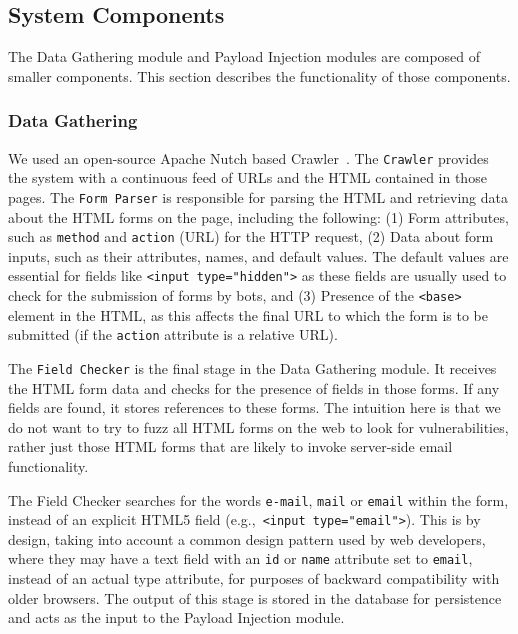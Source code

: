 \subsection{System Components}
\label{Comp}

The Data Gathering module and Payload Injection modules are composed of smaller components. This section describes the functionality of those components.

\subsubsection{Data Gathering}
\label{Comp:Crawler}
We used an open-source Apache Nutch based Crawler~\cite{nutch}. The \texttt{Crawler} provides the system with a continuous feed of URLs and the HTML contained in those pages. 
\label{Comp:FP}
The \texttt{Form Parser} is responsible for parsing the HTML and retrieving data about the HTML
forms on the page, including the following: (1) Form attributes, such
as \texttt{method} and \texttt{action} (URL) for the HTTP request, (2)
Data about form inputs, such as their attributes, names, and
default values. The default values are essential for fields like
{\lstinline{<input type="hidden">}} as these fields are usually used
to check for the submission of forms by bots, and (3) Presence of the {\lstinline{<base>}} element in the HTML, as this affects the final URL to which the form is to be submitted (if the \texttt{action} attribute is a relative URL).

\label{Comp:EMFC}
The \texttt{\Email Field Checker} is the final stage in the Data Gathering module. It receives the HTML form data and checks for the presence of \email fields in those forms. If any \email fields are found, it stores references to these forms.
The intuition here is that we do not want to try to fuzz all HTML forms on the web to look for \ehi vulnerabilities, rather just those HTML forms that are likely to invoke server-side email functionality.

The \Email Field Checker searches for the words \texttt{e-mail},
\texttt{mail} or \texttt{email} within the form, instead of an
explicit HTML5 \email field (e.g.,\ {\lstinline{<input type="email">}}). This is by design, taking into account a common
design pattern used by web developers, where they may have a text
field with an \texttt{id} or \texttt{name} attribute set to
\texttt{email}, instead of an actual \email type attribute, for
purposes of backward compatibility with older browsers. The output of this stage is stored in the database for persistence and acts as the input to the Payload Injection module.

